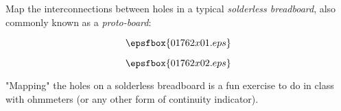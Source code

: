 

Map the interconnections between holes in a typical {\it solderless breadboard}, also commonly known as a {\it proto-board}:

$$\epsfbox{01762x01.eps}$$







$$\epsfbox{01762x02.eps}$$







"Mapping" the holes on a solderless breadboard is a fun exercise to do in class with ohmmeters (or any other form of continuity indicator).




